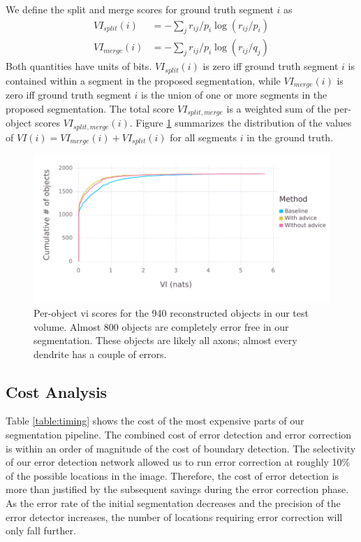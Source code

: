 \documentclass{article}
\begin{document}
We define the split and merge scores for ground truth segment $i$ as
\begin{align*}
	VI_{split}(i) &= -\sum_j r_{ij}/p_i \log(r_{ij}/p_i)\\
	VI_{merge}(i) &= -\sum_j r_{ij}/p_i \log(r_{ij}/q_j)
\end{align*}
Both quantities have units of bits. $VI_{split}(i)$ is zero iff ground truth segment $i$ is contained within a segment in the proposed segmentation, while $VI_{merge}(i)$ is zero iff ground truth segment $i$ is the union of one or more segments in the proposed segmentation. The total score $VI_{split, merge}$ is a weighted sum of the per-object scores $VI_{split,merge}(i)$. Figure \ref{fig:decomp_vi_scores} summarizes the distribution of the values of $VI(i)=VI_{merge}(i)+VI_{split}(i)$ for all segments $i$ in the ground truth.
\begin{figure}
\begin{center}
\includegraphics[width=0.65\linewidth]{per_object_vi.pdf}
\caption{Per-object vi scores for the 940 reconstructed objects in our test volume. Almost 800 objects are completely error free in our segmentation. These objects are likely all axons; almost every dendrite has a couple of errors.}
\label{fig:decomp_vi_scores}
\end{center}
\end{figure}


\subsection{Cost Analysis}
Table \ref{table:timing} shows the cost of the most expensive parts of our segmentation pipeline. The combined cost of error detection and error correction is within an order of magnitude of the cost of boundary detection. The selectivity of our error detection network allowed us to run error correction at roughly 10\% of the possible locations in the image. Therefore, the cost of error detection is more than justified by the subsequent savings during the error correction phase. As the error rate of the initial segmentation decreases and the precision of the error detector increases, the number of locations requiring error correction will only fall further.
\end{document}
